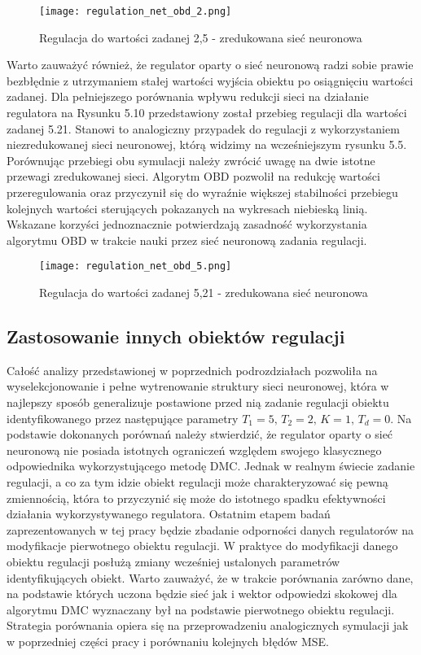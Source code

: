 \begin{figure}[!htb]
  \label{fig:Regulation-OBD-2}
  \centering \texttt{[image: regulation\_net\_obd\_2.png]}
  \caption{Regulacja do wartości zadanej 2,5 - zredukowana sieć neuronowa}
\end{figure}

\par Warto zauważyć również, że regulator oparty o sieć neuronową radzi sobie prawie bezbłędnie z utrzymaniem stałej wartości wyjścia obiektu po osiągnięciu wartości zadanej. Dla pełniejszego porównania wpływu redukcji sieci na działanie regulatora na Rysunku 5.10 przedstawiony został przebieg regulacji dla wartości zadanej 5.21. Stanowi to analogiczny przypadek do regulacji z wykorzystaniem niezredukowanej sieci neuronowej, którą widzimy na wcześniejszym rysunku 5.5. Porównując przebiegi obu symulacji należy zwrócić uwagę na dwie istotne przewagi zredukowanej sieci. Algorytm OBD pozwolił na redukcję wartości przeregulowania oraz przyczynił się do wyraźnie większej stabilności przebiegu kolejnych wartości sterujących pokazanych na wykresach niebieską linią. Wskazane korzyści jednoznacznie potwierdzają zasadność wykorzystania algorytmu OBD w trakcie nauki przez sieć neuronową zadania regulacji.
 
\begin{figure}[!htb]
  \label{fig:Regulation-OBD-5}
  \centering \texttt{[image: regulation\_net\_obd\_5.png]}
  \caption{Regulacja do wartości zadanej 5,21 - zredukowana sieć neuronowa}
\end{figure}

\subsection{Zastosowanie innych obiektów regulacji}

\par Całość analizy przedstawionej w poprzednich podrozdziałach pozwoliła na wyselekcjonowanie i pełne wytrenowanie struktury sieci neuronowej, która w najlepszy sposób generalizuje postawione przed nią zadanie regulacji obiektu identyfikowanego przez następujące parametry \( T_1=5, \, T_2=2, \, K=1, \, T_d=0 \). Na podstawie dokonanych porównań należy stwierdzić, że regulator oparty o sieć neuronową nie posiada istotnych ograniczeń względem swojego klasycznego odpowiednika wykorzystującego metodę DMC. Jednak w realnym świecie zadanie regulacji, a co za tym idzie obiekt regulacji może charakteryzować się pewną zmiennością, która to przyczynić się może do istotnego spadku efektywności działania wykorzystywanego regulatora. Ostatnim etapem badań zaprezentowanych w tej pracy będzie zbadanie odporności danych regulatorów na modyfikacje pierwotnego obiektu regulacji. W praktyce do modyfikacji danego obiektu regulacji posłużą zmiany wcześniej ustalonych parametrów identyfikujących obiekt. Warto zauważyć, że w trakcie porównania zarówno dane, na podstawie których uczona będzie sieć jak i wektor odpowiedzi skokowej dla algorytmu DMC wyznaczany był na podstawie pierwotnego obiektu regulacji. Strategia porównania opiera się na przeprowadzeniu analogicznych symulacji jak w poprzedniej części pracy i porównaniu kolejnych błędów MSE.   

